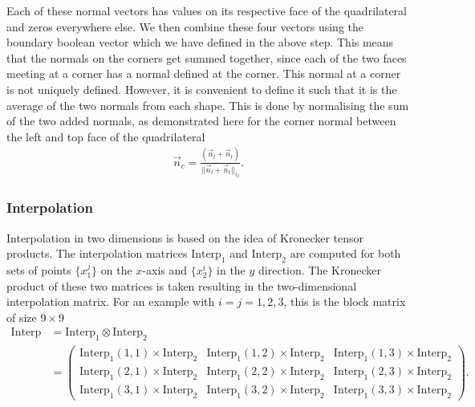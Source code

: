 \documentclass[11pt, a4paper]{article}
\theoremstyle{definition}
\begin{document}
Each of these normal vectors has values on its respective face of the quadrilateral and zeros everywhere else. We then combine these four vectors using the boundary boolean vector which we have defined in the above step. This means that the normals on the corners get summed together, since each of the two faces meeting at a corner has a normal defined at the corner. This normal at a corner is not uniquely defined. However, it is convenient to define it such that it is the average of the two normals from each shape. This is done by normalising the sum of the two added normals, as demonstrated here for the corner normal between the left and top face of the quadrilateral
\begin{align*}
	\vec n_c = \frac{\left(\vec n_{l} + \vec n_{t} \right)}{||\vec n_{l} + \vec n_{t}  ||_{l_2}}.
\end{align*}

\subsubsection{Interpolation}
Interpolation in two dimensions is based on the idea of Kronecker tensor products. The interpolation matrices $\text{Interp}_1$ and $\text{Interp}_2$ are computed for both sets of points $\{x_1^j\}$ on the $x$-axis and $\{x_2^i\}$ in the $y$ direction. The Kronecker product of these two matrices is taken resulting in the two-dimensional interpolation matrix. For an example with $i = j = 1,2,3$, this is the block matrix of size $ 9 \times 9$
\begin{align*}
	\text{Interp} &= \text{Interp}_1 \otimes \text{Interp}_2 \\
	&= 
	\begin{pmatrix}
		\text{Interp}_1(1,1) \times \text{Interp}_2 & \text{Interp}_1(1,2) \times \text{Interp}_2& \text{Interp}_1(1,3)  \times \text{Interp}_2\\
		\text{Interp}_1(2,1)  \times \text{Interp}_2 & \text{Interp}_1(2,2) \times  \text{Interp}_2& \text{Interp}_1(2,3)  \times \text{Interp}_2\\
		\text{Interp}_1(3,1)  \times \text{Interp}_2 & \text{Interp}_1(3,2)  \times \text{Interp}_2& \text{Interp}_1(3,3)  \times \text{Interp}_2
	\end{pmatrix}.
\end{align*}
\end{document}
